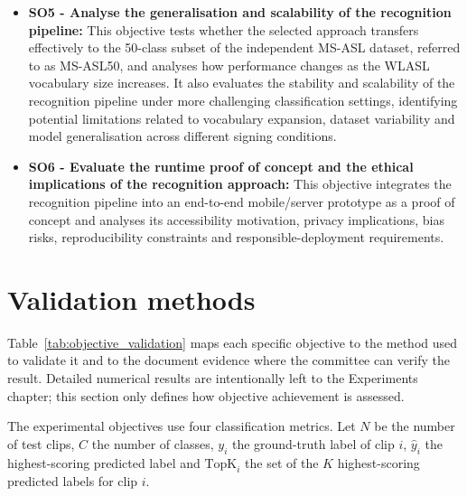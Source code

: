 \begin{itemize}
    \item \textbf{SO5 - Analyse the generalisation and scalability of the recognition pipeline:} This objective tests whether the selected approach transfers effectively to the 50-class subset of the independent MS-ASL dataset, referred to as MS-ASL50, and analyses how performance changes as the WLASL vocabulary size increases. It also evaluates the stability and scalability of the recognition pipeline under more challenging classification settings, identifying potential limitations related to vocabulary expansion, dataset variability and model generalisation across different signing conditions.

    \item \textbf{SO6 - Evaluate the runtime proof of concept and the ethical implications of the recognition approach:} This objective integrates the recognition pipeline into an end-to-end mobile/server prototype as a proof of concept and analyses its accessibility motivation, privacy implications, bias risks, reproducibility constraints and responsible-deployment requirements.
\end{itemize}

\section{Validation methods}
\label{sec:objective_validation}

Table~\ref{tab:objective_validation} maps each specific objective to the method used to validate it
and to the document evidence where the committee can verify the result. Detailed numerical results
are intentionally left to the Experiments chapter; this section only defines how objective
achievement is assessed.

The experimental objectives use four classification metrics. Let $N$ be the number of test clips,
$C$ the number of classes, $y_i$ the ground-truth label of clip $i$, $\hat{y}_i$ the
highest-scoring predicted label and $\mathrm{TopK}_i$ the set of the $K$ highest-scoring predicted
labels for clip $i$.

